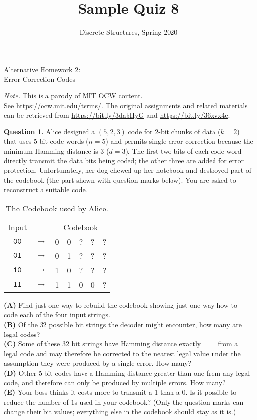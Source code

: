 \documentclass[jou]{apa6}
\title{Sample Quiz 8}
\author{Discrete Structures, Spring 2020}
\affiliation{RBS}
\begin{document}
\twocolumn
\thispagestyle{empty}

\begin{center}
{\Large Alternative Homework 2:}\\
{\Large Error Correction Codes}
\end{center}


\begin{changemargin}{10pt}{10pt}
{\footnotesize
{\em Note.} This is a parody of MIT OCW content.\\
See \url{https://ocw.mit.edu/terms/}. 
The original assignments and related materials can be retrieved from 
\url{https://bit.ly/3dabHyG} and \url{https://bit.ly/36xvx4e}.\\
}
\end{changemargin}


{\bf Question 1.} 
Alice designed a $(5, 2, 3)$ code for $2$-bit chunks of data ($k=2$) that uses $5$-bit code words
($n=5$) and permits single-error correction because the minimum Hamming distance is 3 ($d=3$). 
The first two bits of each code word directly transmit 
the data bits being coded; the other three are added for error protection.
Unfortunately, her dog chewed up her notebook and 
destroyed part of the codebook (the part shown with
question marks below). You are asked to reconstruct a suitable code.

{\footnotesize
\begin{table}[h]
\begin{center}
\begin{tabular}{ccccccc}
Input & & \multicolumn{5}{c}{Codebook} \\
$\mathtt{00}$ & $\rightarrow$ & 0 & 0 & ? & ? & ? \\
$\mathtt{01}$ & $\rightarrow$ & 0 & 1 & ? & ? & ? \\
$\mathtt{10}$ & $\rightarrow$ & 1 & 0 & ? & ? & ? \\
$\mathtt{11}$ & $\rightarrow$ & 1 & 1 & 0 & 0 & ? \\
\end{tabular}
\caption{\label{tab:codes523}The Codebook used by Alice.}
\end{center}
\end{table}
}


{\bf (A)} Find just one way to rebuild the codebook \textendash{} 
showing just one way how to code each of the four input strings.\\[4pt]
{\bf (B)} Of the $32$ possible bit strings the decoder might encounter, 
how many are legal codes?\\[4pt]
{\bf (C)} Some of these 32 bit strings have Hamming distance 
exactly $=1$ from a legal code and may therefore be corrected to
the nearest legal value under the assumption they were produced 
by a single error. How many?\\[4pt]
{\bf (D)} Other 5-bit codes have a Hamming distance greater than one from 
any legal code, and therefore can
only be produced by multiple errors. How many?\\[4pt]
{\bf (E)} Your boss thinks it costs more to transmit a 1 than a 0.
Is it possible to reduce the number of $1$s used in your codebook?
(Only the question marks can change their bit values; 
everything else in the codebook should stay as it is.)
\end{document}
